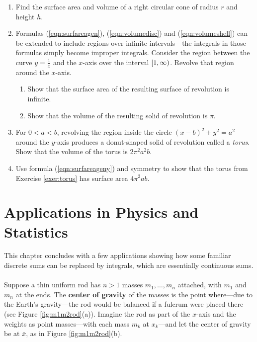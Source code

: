 {\begin{enumerate}[\bfseries 1.]
  \ref{exer:ellipsoid} is $\frac{4}{3}\,\pi\,a\,b^2$.
 \item Find the surface area and volume of a right circular cone of radius $r$
  and height $h$.
 \item Formulas (\ref{eqn:surfareagen}), (\ref{eqn:volumedisc}) and
  (\ref{eqn:volumeshell}) can be extended to include regions over infinite
  intervals---the integrals in those formulas simply become improper integrals.
  Consider the region between the curve $y=\frac{1}{x}$ and the $x$-axis over
  the interval $\lbrack 1,\infty )$. Revolve that region around the $x$-axis.
\begin{enumerate}[\bfseries (a)]
 \item Show that the surface area of the resulting surface of revolution is
  infinite.
 \item Show that the volume of the resulting solid of revolution is $\pi$.
\end{enumerate}
 \item\label{exer:torus} For $0<a<b$, revolving the region inside the circle
  $(x-b)^2+y^2=a^2$ around the $y$-axis produces a donut-shaped solid of
  revolution called a \emph{torus}. Show that the volume of the
  torus is $2\pi^2a^2b$.
 \item Use formula (\ref{eqn:surfareageny}) and symmetry to show that the torus
  from Exercise \ref{exer:torus} has surface area $4\pi^2ab$.
\end{enumerate}}
\newpage
\section{Applications in Physics and Statistics}
This chapter concludes with a few applications showing how some familiar
discrete sums can be replaced by integrals, which are essentially
continuous sums.\\

\\

Suppose a thin uniform rod has $n>1$ masses $m_1,\ldots,m_n$
attached, with $m_1$ and $m_n$ at the ends. The \textbf{center of gravity} of
the masses is the point where---due to the Earth's gravity---the rod would be
balanced if a fulcrum were placed there (see Figure \ref{fig:m1m2rod}(a)).
Imagine the rod as part of the $x$-axis and the weights as point masses---with
each mass $m_k$ at $x_k$---and let the center of gravity be at $\bar{x}$, as in
Figure \ref{fig:m1m2rod}(b).

